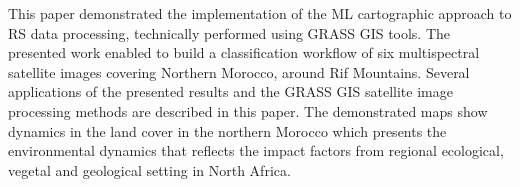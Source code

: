 \documentclass[geomatics,article,submit,pdftex,moreauthors]{Definitions/mdpi}
\begin{document}
This paper demonstrated the implementation of the ML cartographic approach to RS data processing, technically performed using GRASS GIS tools. The presented work enabled to build a classification workflow of six multispectral satellite images covering Northern Morocco, around Rif Mountains. Several applications of the presented results and the GRASS GIS satellite image processing methods are described in this paper. The demonstrated maps show dynamics in the land cover in the northern Morocco which presents the environmental dynamics that reflects the impact factors from regional ecological, vegetal and geological setting in North Africa.







\end{document}
